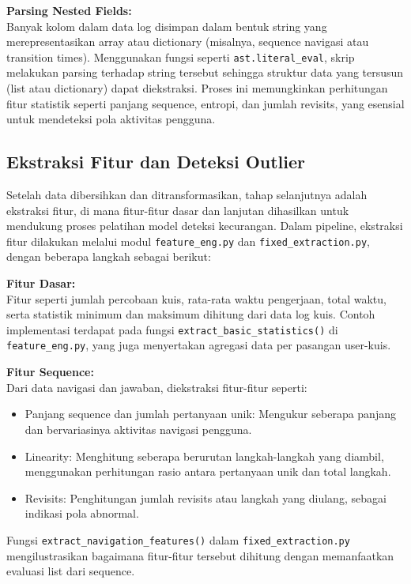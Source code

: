 \textbf{Parsing Nested Fields:} \\
Banyak kolom dalam data log disimpan dalam bentuk string yang merepresentasikan array atau dictionary (misalnya, sequence navigasi atau transition times). Menggunakan fungsi seperti \texttt{ast.literal\_eval}, skrip melakukan parsing terhadap string tersebut sehingga struktur data yang tersusun (list atau dictionary) dapat diekstraksi. Proses ini memungkinkan perhitungan fitur statistik seperti panjang sequence, entropi, dan jumlah revisits, yang esensial untuk mendeteksi pola aktivitas pengguna.

\subsection{Ekstraksi Fitur dan Deteksi Outlier}
\label{sec:ekstraksiFiturDeteksiOutlier}
Setelah data dibersihkan dan ditransformasikan, tahap selanjutnya adalah ekstraksi fitur, di mana fitur-fitur dasar dan lanjutan dihasilkan untuk mendukung proses pelatihan model deteksi kecurangan. Dalam pipeline, ekstraksi fitur dilakukan melalui modul \texttt{feature\_eng.py} dan \texttt{fixed\_extraction.py}, dengan beberapa langkah sebagai berikut:

\textbf{Fitur Dasar:} \\
Fitur seperti jumlah percobaan kuis, rata-rata waktu pengerjaan, total waktu, serta statistik minimum dan maksimum dihitung dari data log kuis. Contoh implementasi terdapat pada fungsi \texttt{extract\_basic\_statistics()} di \texttt{feature\_eng.py}, yang juga menyertakan agregasi data per pasangan user-kuis.

\textbf{Fitur Sequence:} \\
Dari data navigasi dan jawaban, diekstraksi fitur-fitur seperti:
\begin{itemize}
    \item Panjang sequence dan jumlah pertanyaan unik: Mengukur seberapa panjang dan bervariasinya aktivitas navigasi pengguna.
    \item Linearity: Menghitung seberapa berurutan langkah-langkah yang diambil, menggunakan perhitungan rasio antara pertanyaan unik dan total langkah.
    \item Revisits: Penghitungan jumlah revisits atau langkah yang diulang, sebagai indikasi pola abnormal.
\end{itemize}
Fungsi \texttt{extract\_navigation\_features()} dalam \texttt{fixed\_extraction.py} mengilustrasikan bagaimana fitur-fitur tersebut dihitung dengan memanfaatkan evaluasi list dari sequence.

